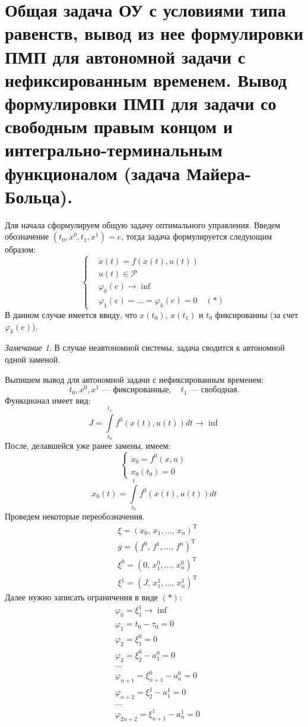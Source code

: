 \documentclass[oneside, final, 14pt, draft]{article}
\theoremstyle{definition}
\theoremstyle{definition}
\theoremstyle{remark}
\newtheorem{rmk}{Замечание}[section]
\theoremstyle{theorem}
\begin{document}
\section{Общая задача ОУ с условиями типа равенств, вывод из нее формулировки ПМП для автономной задачи с нефиксированным временем. Вывод формулировки ПМП для задачи со свободным правым концом и интегрально-терминальным функционалом (задача Майера-Больца).}
Для начала сформулируем общую задачу оптимального управления. Введем обозначение $(t_0, x^0, t_1, x^1) = e$, тогда задача формулируется следующим образом:
\begin{equation*}
\begin{cases}
&\dot{x}(t) = f(x(t), u(t))\\
&u(t) \in \mathcal{P}\\
&\varphi_0(e) \rightarrow \inf\\
&\varphi_1(e) = ... = \varphi_k(e) = 0\quad (*)
\end{cases}
\end{equation*}
В данном случае имеется ввиду, что $x(t_0)$, $x(t_1)$ и $t_0$ фиксированны (за счет $\varphi_k(e)$). 
\begin{rmk}
В случае неавтономной системы, задача сводится к автономной одной заменой.
\end{rmk}
{\flushleft Выпишем вывод для автономной задачи с нефиксированным временем:}
$$ t_0, x^0, x^1 \text{ --- фиксированные},\quad t_1 \text{ --- свободная.}$$
Функционал имеет вид:
$$ J = \int\limits_{t_0}^{t_1} f^0(x(t), u(t))dt \rightarrow \inf$$
После, делавшейся уже ранее замены, имеем:
\begin{equation*}
\begin{cases}
\dot{x}_0 = f^0(x, u)\\
x_0(t_0) = 0
\end{cases}
\end{equation*}
$$ x_0(t) = \int\limits_{t_0}^t f^0(x(t), u(t))dt$$
Проведем некоторые переобозначения.
\begin{align*}
&\xi = (x_0,\, x_1,\ldots,\,x_n)^\mathrm{T}\\
&g = (f^0,\,f^1,\ldots,\,f^n)^\mathrm{T}\\
&\xi^0 = (0,\,x_1^0,\ldots,\,x_n^0)^\mathrm{T}\\
&\xi^1 = (J,\,x_1^1,\ldots,\,x_n^1)^\mathrm{T}
\end{align*}
Далее нужно записать ограничения в виде $(*)$:
$$
\begin{aligned}
    &\varphi_0 = \xi_1^1 \rightarrow \inf\\
    &\varphi_1 = t_0 - \tau_0 = 0\\
    &\varphi_2 = \xi_1^0 = 0\\
    &\varphi_3 = \xi_2^0 - a_1^0 = 0\\
    &\ldots \\
    &\varphi_{n+1} = \xi_{n+1}^0 - a_n^0 = 0\\
    &\varphi_{n+2} = \xi_2^1 - a_1^1 = 0\\
    &\ldots \\
    &\varphi_{2n+2} = \xi_{n+1}^1 - a_n^1 = 0   
\end{aligned}
$$
\end{document}
